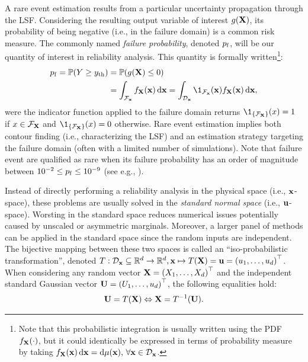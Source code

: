 A rare event estimation results from a particular uncertainty propagation through the LSF. 
Considering the resulting output variable of interest $g({\bf X})$, its probability of being negative (i.e., in the failure domain) is a common risk measure.
The commonly named \textit{failure probability}, denoted $p_\mathrm{f}$, will be our quantity of interest in reliability analysis.
This quantity is formally written\footnote{Note that this probabilistic integration is usually written using the PDF $f_{\bf X}(\cdot)$, but it could identically be expressed in terms of probability measure by taking $f_{\bf X}({\bf x}) \, \mathrm{d}{\bf x} = \mathrm{d} \mu({\bf x}), \, \forall {\bf x} \in \mathcal{D}_{\bf x}$.}: 
\begin{equation}
    \begin{split}
        \pf = \P(Y \geq \yth) &= \P(g(\bX) \leq 0)\\
        &= \int_{\iF_\bx} f_\bX(\bx) \, \dd\bx
        = \int_{\iD_\bx} \1_{\iF_\bx}(\bx) f_\bX(\bx) \, \dd\bx,
    \end{split}
    \label{eq:pf}
\end{equation}
were the indicator function applied to the failure domain returns $\1_{\left\{\iF_{\bX}\right\}}(x) = 1$ if $x \in \mathcal{F}_{{\bf X}}$ and $\1_{\left\{\iF_{\bX}\right\}}(x) = 0$ otherwise.
Rare event estimation implies both contour finding (i.e., characterizing the LSF) and an estimation strategy targeting the failure domain (often with a limited number of simulations).
Note that failure event are qualified as rare when its failure probability has an order of magnitude between $10^{-2} \leq p_\mathrm{f} \leq 10^{-9}$ (see e.g., \citet{lemaire_2013}).

Instead of directly performing a reliability analysis in the physical space (i.e., ${\bf x}$-space), these problems are usually solved in the \emph{standard normal space} (i.e., ${\bf u}$-space).
Worsting in the standard space reduces numerical issues potentially caused by unscaled or asymmetric marginals. 
Moreover, a larger panel of methods can be applied in the standard space since the random inputs are independent.   
The bijective mapping between these two spaces is called an ``iso-probabilistic transformation'', 
denoted $T: \mathcal{D}_{{\bf x}} \subseteq \mathbb{R}^d \rightarrow \mathbb{R}^d, {\bf x} \mapsto T({\bf X}) = {\bf u} = \left(u_1, \dots, u_d\right)^\top$. 
When considering any random vector ${\bf X} = \left(X_1, \dots, X_d\right)^\top$ and the independent standard Gaussian vector ${\bf U} = \left(U_1, \dots, u_d\right)^\top$, the following equalities hold:
\begin{equation}
    {\bf U} = T({\bf X}) \Leftrightarrow {\bf X} = T^{-1}({\bf U}).
\end{equation} 

